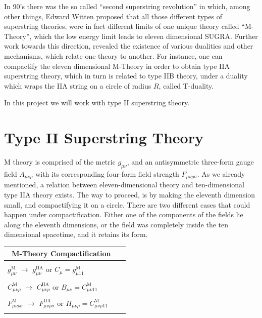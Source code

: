 \documentclass[a4paper,notitlepage]{report}
\begin{document}
In 90's there was the so called ``second superstring revolution'' in which, among other things, Edward Witten proposed that all those different types of superstring theories, were in fact different limits of one unique theory called ``M-Theory'', which the low energy limit leads to eleven dimensional SUGRA. Further work towards this direction, revealed the existence of various dualities and other mechanisms, which relate one theory to another. For instance, one can compactify the eleven dimensional M-Theory in order to obtain type IIA superstring theory, which in turn is related to type IIB theory, under a duality which wraps the IIA string on a circle of radius $R$, called T-duality.

In this project we will work with type II superstring theory.

\section{Type II Superstring Theory}

M theory is comprised of the metric $g_{\mu\nu}$, and an antisymmetric three-form gauge field $A_{\mu\nu\rho}$ with its corresponding four-form field strength $F_{\mu\nu\rho\sigma}$. As we already mentioned, a relation between eleven-dimensional theory and ten-dimensional type IIA theory exists. The way to proceed, is by making the eleventh dimension small, and compactifying it on a circle. There are two different cases that could happen under compactification. Either one of the components of the fields lie along the eleventh dimensions, or the field was completely inside the ten dimensional spacetime, and it retains its form.

\vspace{2em}

\begin{center}
\begin{tabular}{llr}
\toprule
\multicolumn{2}{c}{\:\:\:\:\:\:\:\: M-Theory Compactification} \:\:\:\:\:\:\:\: \\
\midrule
{\small{}}\\
\:\:\:\:\:\:\:\:\:\: $g^{\text{M}}_{\mu\nu}$ $\rightarrow$ $g^{\text{IIA}}_{\mu\nu}$ or $C_{\mu} = g^{\text{M}}_{\mu 11}$    \\\\
\:\:\:\:\:\:\:\: $C^{\text{M}}_{\mu\nu\rho}$ $\rightarrow$ $C^{\text{IIA}}_{\mu\nu\rho}$ or $B_{\mu\nu} = C^{\text{M}}_{\mu\nu11}$ \\\\
\:\:\:\:\:\: $F^{\text{M}}_{\mu\nu\rho\sigma}$ $\rightarrow$ $F^{\text{IIA}}_{\mu\nu\rho\sigma}$ or $H_{\mu\nu\rho} = C^{\text{M}}_{\mu\nu\rho11}$ \\\\
\bottomrule
\end{tabular}
\end{center}
\end{document}

